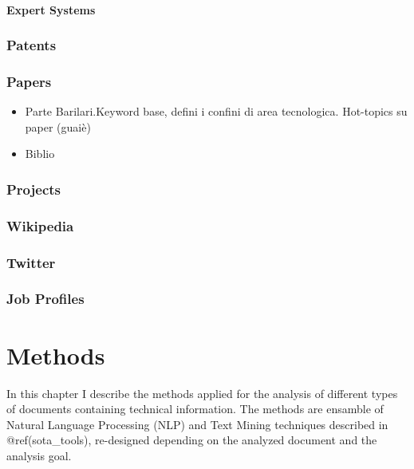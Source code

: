\documentclass[]{book}
\providecommand{\tightlist}{%
  \setlength{\itemsep}{0pt}\setlength{\parskip}{0pt}}
\begin{document}
\subsubsection{Expert Systems}\label{expert-systems}

\subsection{Patents}\label{sotadocumentspatents}

\subsection{Papers}\label{sotadocumentspapers}

\begin{itemize}
\tightlist
\item
  Parte Barilari.Keyword base, defini i confini di area tecnologica.
  Hot-topics su paper (guaiè)
\item
  Biblio
\end{itemize}

\subsection{Projects}\label{sotadocumentsprojects}

\subsection{Wikipedia}\label{sotadocumentswiki}

\subsection{Twitter}\label{sotadocumentstwitter}

\subsection{Job Profiles}\label{sotadocumentsjobs}

\chapter{Methods}\label{methods}

In this chapter I describe the methods applied for the analysis of
different types of documents containing technical information. The
methods are ensamble of Natural Language Processing (NLP) and Text
Mining techniques described in @ref(sota\_tools), re-designed depending
on the analyzed document and the analysis goal.
\end{document}

